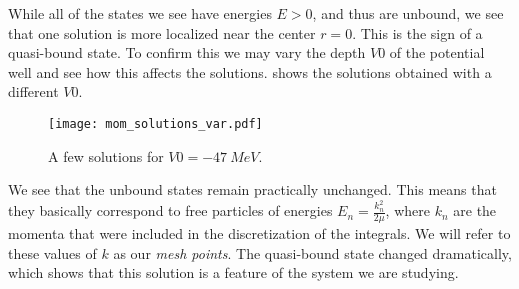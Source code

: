  While all of the states we see have energies $E>0$, and thus are unbound, we see that one solution is more localized near the center $r=0$. This is the sign of a quasi-bound state. To confirm this we may vary the depth $V0$ of the potential well and see how this affects the solutions.  shows the solutions obtained with a different $V0$.
\begin{figure}
  \centering
  \texttt{[image: mom\_solutions\_var.pdf]}
  \caption{A few solutions for $V0=\SI{-47}{MeV}$.}
  \label{fig:momspace solutions var}
\end {figure}
We see that the unbound states remain practically unchanged. This means that they basically correspond to free particles of energies $E_n=\frac{k_n^2}{2\mu}$, where $k_n$ are the momenta that were included in the discretization of the integrals. We will refer to these values of $k$ as our \emph{mesh points}. The quasi-bound state changed dramatically, which shows that this solution is a feature of the system we are studying.  
